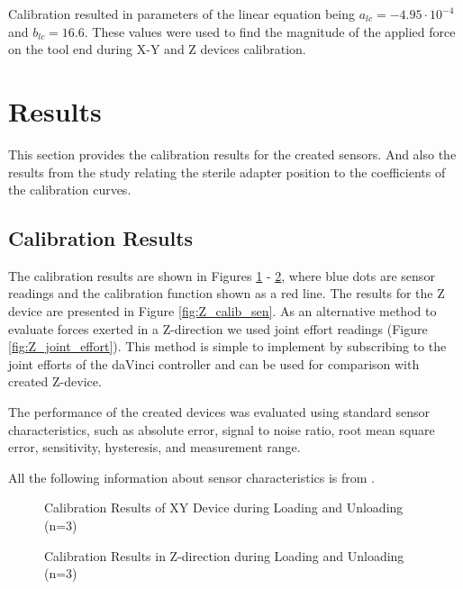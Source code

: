 	Calibration resulted in parameters of the linear equation being  $a_{lc} = -4.95 \cdot 10^{-4}$ and $b_{lc} = 16.6$. These values were used to find the magnitude of the applied force on the tool end during X-Y and Z devices calibration.

\section{Results}
\label{sec:res}
This section provides the calibration results for the created sensors. And also the results from the study relating the sterile adapter position to the coefficients of the calibration curves.

\subsection{Calibration Results}
\label{ssec:Cal_Res}

The calibration results are shown in Figures \ref{fig:XY_calib_res} - \ref{fig:Z_calib_res}, where blue dots are sensor readings and the calibration function shown as a red line. The results for the Z device are presented in Figure \ref{fig:Z_calib_sen}. As an alternative method to evaluate forces exerted in a Z-direction we used joint effort readings (Figure \ref{fig:Z_joint_effort}). This method is simple to implement by subscribing to the joint efforts of the daVinci controller and can be used for comparison with created Z-device.

The performance of the created devices was evaluated using standard sensor characteristics, such as absolute error, signal to noise ratio, root mean square error, sensitivity, hysteresis, and measurement range.

All the following information about sensor characteristics is from \cite{kalantar-zadeh_sensors_2013}.

\begin{figure}[h]%
\centering
{}%
\qquad
{}%
\caption[Calibration Results of XY Device]
{Calibration Results of XY Device during Loading and Unloading (n=3)}
\label{fig:XY_calib_res}%
\end{figure}

\begin{figure}[h]%
\centering
{}%
\qquad
{}%
\caption[Calibration Results in Z-direction]
{Calibration Results in Z-direction during Loading and Unloading (n=3)}
\label{fig:Z_calib_res}%
\end{figure}


